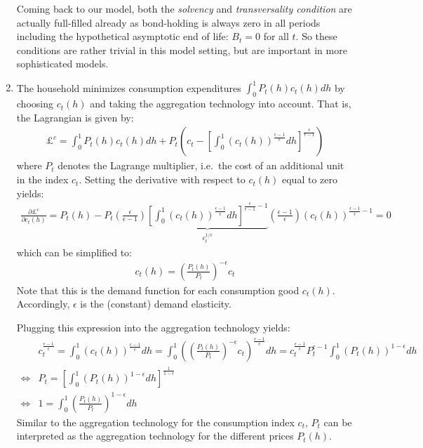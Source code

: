 \begin{enumerate}
Coming back to our model, both the \emph{solvency} and \emph{transversality condition} are actually full-filled already
  as bond-holding is always zero in all periods including the hypothetical asymptotic end of life: \(B_t=0\) for all \(t\).
So these conditions are rather trivial in this model setting, but are important in more sophisticated models.

\item The household minimizes consumption expenditures \(\int_0^1 P_t(h) c_t(h)dh\) by choosing \(c_t(h)\) and taking the aggregation technology into account.
That is, the Lagrangian is given by:
\begin{align*}
	\pounds^c = \int_0^1 P_t(h) c_t(h)dh + P_t \left( c_t - {\left[\int_0^1 {(c_t(h))}^{\frac{\epsilon-1}{\epsilon}}dh\right]}^{\frac{\epsilon}{\epsilon-1}} \right)
\end{align*}
where \(P_t\) denotes the Lagrange multiplier, i.e.\ the cost of an additional unit in the index \(c_t\).
Setting the derivative with respect to \(c_t(h)\) equal to zero yields:
\begin{align*}
	\frac{\partial \pounds^c}{\partial c_t(h)} = P_t(h) - P_t \left(\frac{\epsilon}{\epsilon-1}\right) \underbrace{{\left[\int_0^1 {(c_t(h))}^{\frac{\epsilon-1}{\epsilon}}dh\right]}^{\frac{\epsilon}{\epsilon-1}-1}}_{c_t^{1/\epsilon}} \left(\frac{\epsilon-1}{\epsilon}\right) {(c_t(h))}^{\frac{\epsilon-1}{\epsilon}-1} = 0
\end{align*}
which can be simplified to:
\begin{align*}
	c_t(h) = {\left(\frac{P_t(h)}{P_t}\right)}^{-\epsilon} c_t
\end{align*}
Note that this is the demand function for each consumption good \(c_t(h)\).
Accordingly, \(\epsilon \) is the (constant) demand elasticity.
	
Plugging this expression into the aggregation technology yields:
\begin{align}
	&c_t^{\frac{\epsilon-1}{\epsilon}} = \int_0^1 {(c_t(h))}^{\frac{\epsilon-1}{\epsilon}}dh = \int_0^1 {\left({\left(\frac{P_t(h)}{P_t}\right)}^{-\epsilon} c_t\right)}^{\frac{\epsilon-1}{\epsilon}}dh = c_t^{\frac{\epsilon-1}{\epsilon}} P_t^{\epsilon-1} \int_0^1 {(P_t(h))}^{1-\epsilon}dh \nonumber
	\\
	\Leftrightarrow &
	P_t = {\left[\int_0^1 {(P_t(h))}^{1-\epsilon}dh\right]}^{\frac{1}{1-\epsilon}} \nonumber
	\\
	\Leftrightarrow &
	1 = \int_0^1 {\left(\frac{P_t(h)}{P_t}\right)}^{1-\epsilon}dh \label{eq:AggregatePriceIndex}
\end{align}
Similar to the aggregation technology for the consumption index \(c_t\),
  \(P_t\) can be interpreted as the aggregation technology for the different prices \(P_t(h)\).


\end{enumerate}
